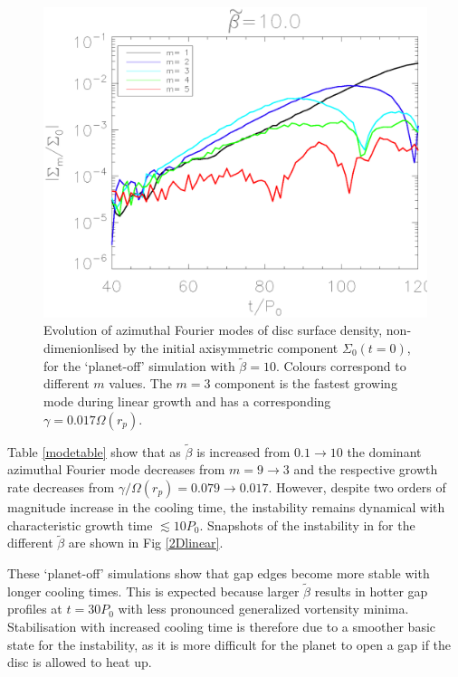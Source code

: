 \begin{figure}
  \includegraphics[width=\linewidth,clip=true,trim=1.2cm
  0cm 0cm 0cm]{figures/linear_stability}
  \caption{Evolution of azimuthal Fourier modes of disc surface
    density, non-dimenionlised by the initial axisymmetric component 
    $\Sigma_0(t=0)$, for the
    `planet-off' simulation with $\tilde{\beta}=10$. Colours correspond
    to different $m$ values. The $m=3$ component is the fastest growing
    mode during linear growth and has a corresponding
    $\gamma=0.017\Omega(r_p)$.\label{linearmodes}}
\end{figure}


Table \ref{modetable} show that as
$\tilde{\beta}$ is increased from $ 0.1\rightarrow10$ the dominant
azimuthal Fourier mode decreases from $ m=9\rightarrow3$ and the
respective growth rate decreases from $ \gamma/\Omega(r_p)=0.079
\rightarrow 0.017$. However, despite two orders of magnitude increase in the
cooling time, the instability remains dynamical with characteristic  growth time
$\lesssim 10P_0$. Snapshots of the instability in for  
the different $\tilde\beta$ are shown in Fig \ref{2Dlinear}. 

These `planet-off' simulations show that gap edges become more stable with
longer cooling times. This is expected because larger $\tilde{\beta}$
results in hotter gap profiles at $t=30P_0$ with less pronounced
generalized vortensity minima. Stabilisation with increased
cooling time is therefore due to a smoother basic state for the
instability, as it is more difficult for the planet to open a gap if
the disc is allowed to heat up. 

